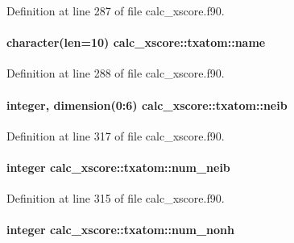 Definition at line 287 of file calc\-\_\-xscore.\-f90.

\hypertarget{structcalc__xscore_1_1txatom_a6e587d40405bc393476bb6800d7dd43c}{
\paragraph[{name}]{\setlength{\rightskip}{0pt plus 5cm}character(len=10) calc\-\_\-xscore\-::txatom\-::name}}\label{structcalc__xscore_1_1txatom_a6e587d40405bc393476bb6800d7dd43c}


Definition at line 288 of file calc\-\_\-xscore.\-f90.

\hypertarget{structcalc__xscore_1_1txatom_a4addf7e0bc4335471a9624fa2746aaa2}{
\paragraph[{neib}]{\setlength{\rightskip}{0pt plus 5cm}integer, dimension(0\-:6) calc\-\_\-xscore\-::txatom\-::neib}}\label{structcalc__xscore_1_1txatom_a4addf7e0bc4335471a9624fa2746aaa2}


Definition at line 317 of file calc\-\_\-xscore.\-f90.

\hypertarget{structcalc__xscore_1_1txatom_ab132c349deb7bad69978755afd6fa865}{
\paragraph[{num\-\_\-neib}]{\setlength{\rightskip}{0pt plus 5cm}integer calc\-\_\-xscore\-::txatom\-::num\-\_\-neib}}\label{structcalc__xscore_1_1txatom_ab132c349deb7bad69978755afd6fa865}


Definition at line 315 of file calc\-\_\-xscore.\-f90.

\hypertarget{structcalc__xscore_1_1txatom_ace358f9084576aae47067aa0afd306f2}{
\paragraph[{num\-\_\-nonh}]{\setlength{\rightskip}{0pt plus 5cm}integer calc\-\_\-xscore\-::txatom\-::num\-\_\-nonh}}\label{structcalc__xscore_1_1txatom_ace358f9084576aae47067aa0afd306f2}


